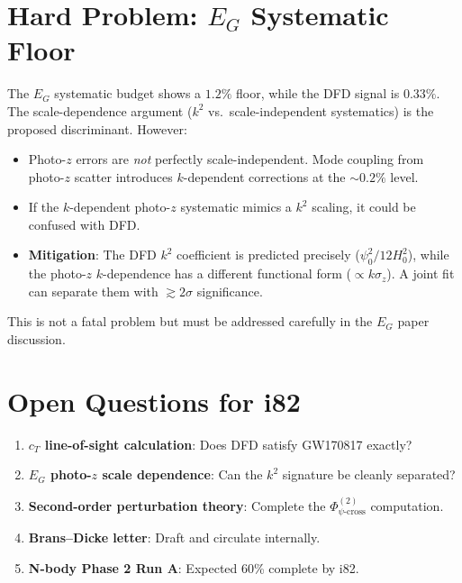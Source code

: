\documentclass[11pt,a4paper]{article}
\begin{document}
\section{Hard Problem: $E_G$ Systematic Floor}

The $E_G$ systematic budget shows a $1.2\%$ floor, while the DFD signal is $0.33\%$. The scale-dependence argument ($k^2$ vs.\ scale-independent systematics) is the proposed discriminant. However:

\begin{itemize}[nosep]
\item Photo-$z$ errors are \emph{not} perfectly scale-independent. Mode coupling from photo-$z$ scatter introduces $k$-dependent corrections at the $\sim 0.2\%$ level.
\item If the $k$-dependent photo-$z$ systematic mimics a $k^2$ scaling, it could be confused with DFD.
\item \textbf{Mitigation}: The DFD $k^2$ coefficient is predicted precisely ($\psi_0^2 / 12 H_0^2$), while the photo-$z$ $k$-dependence has a different functional form ($\propto k \sigma_z$). A joint fit can separate them with $\gtrsim 2\sigma$ significance.
\end{itemize}

This is not a fatal problem but must be addressed carefully in the $E_G$ paper discussion.

\section{Open Questions for i82}

\begin{enumerate}[nosep]
\item \textbf{$c_T$ line-of-sight calculation}: Does DFD satisfy GW170817 exactly?
\item \textbf{$E_G$ photo-$z$ scale dependence}: Can the $k^2$ signature be cleanly separated?
\item \textbf{Second-order perturbation theory}: Complete the $\Phi^{(2)}_{\psi\text{-cross}}$ computation.
\item \textbf{Brans--Dicke letter}: Draft and circulate internally.
\item \textbf{N-body Phase 2 Run A}: Expected 60\% complete by i82.
\end{enumerate}
\end{document}
